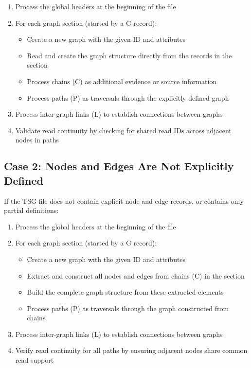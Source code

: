 \documentclass[11pt,a4paper]{article}
\begin{document}
\begin{enumerate}[leftmargin=*]
	\item Process the global headers at the beginning of the file
	\item For each graph section (started by a G record):
	      \begin{itemize}
		      \item Create a new graph with the given ID and attributes
		      \item Read and create the graph structure directly from the records in the section
		      \item Process chains (C) as additional evidence or source information
		      \item Process paths (P) as traversals through the explicitly defined graph
	      \end{itemize}
	\item Process inter-graph links (L) to establish connections between graphs
	\item Validate read continuity by checking for shared read IDs across adjacent nodes in paths
\end{enumerate}

\subsection{Case 2: Nodes and Edges Are Not Explicitly Defined}

If the TSG file does not contain explicit node and edge records, or contains only partial definitions:

\begin{enumerate}[leftmargin=*]
	\item Process the global headers at the beginning of the file
	\item For each graph section (started by a G record):
	      \begin{itemize}
		      \item Create a new graph with the given ID and attributes
		      \item Extract and construct all nodes and edges from chains (C) in the section
		      \item Build the complete graph structure from these extracted elements
		      \item Process paths (P) as traversals through the graph constructed from chains
	      \end{itemize}
	\item Process inter-graph links (L) to establish connections between graphs
	\item Verify read continuity for all paths by ensuring adjacent nodes share common read support
\end{enumerate}
\end{document}
